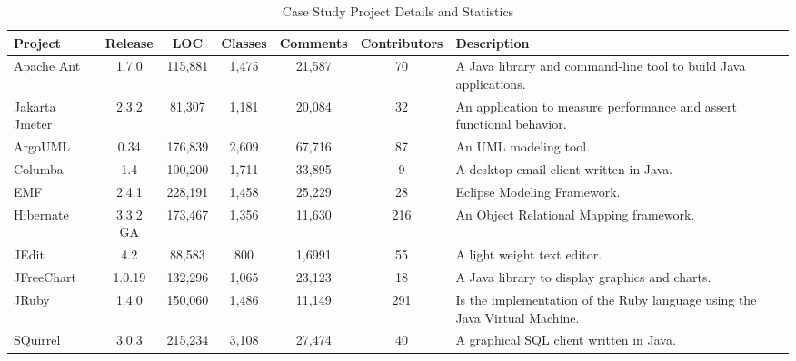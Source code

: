 \begin{table*}[!tbh]
    \begin{center}
        \caption{Case Study Project Details and Statistics}
        \vspace{-2mm}
        \label{tab:projDetails}
        \begin{tabular}{l| c c c c c | p{2.5in}}
            \toprule
            \textbf{Project} & \textbf{Release} & \textbf{LOC} & \textbf{Classes} & \textbf{Comments} & \textbf{Contributors} & \textbf{Description}                                                      
            \\ \midrule
            Apache Ant       & 1.7.0            & 115,881      & 1,475            & 21,587            & 70                    & A Java library and command-line tool to build Java applications.           \\
            Jakarta Jmeter   & 2.3.2            & 81,307       & 1,181            & 20,084            & 32                    & An application to measure performance and assert functional behavior.      \\
            ArgoUML          & 0.34             & 176,839      & 2,609            & 67,716            & 87                    & An UML modeling tool.                                                      \\
            Columba          & 1.4              & 100,200      & 1,711            & 33,895            & 9                     & A desktop email client written in Java.                                    \\
            EMF              & 2.4.1            & 228,191      & 1,458            & 25,229            & 28                    & Eclipse Modeling Framework.                                                \\
            Hibernate        & 3.3.2 GA         & 173,467      & 1,356            & 11,630            & 216                   & An Object Relational Mapping framework.                                    \\
            JEdit            & 4.2              & 88,583       & 800              & 1,6991            & 55                    & A light weight text editor.                                                \\
            JFreeChart       & 1.0.19           & 132,296      & 1,065            & 23,123            & 18                    & A Java library to display graphics and charts.                             \\
            JRuby            & 1.4.0            & 150,060      & 1,486            & 11,149            & 291                   & Is the implementation of the Ruby language using the Java Virtual Machine. \\
            SQuirrel         & 3.0.3            & 215,234      & 3,108            & 27,474            & 40                    & A graphical SQL client written in Java.                                    
            \\ \bottomrule
        \end{tabular}
    \end{center}
\end{table*}

